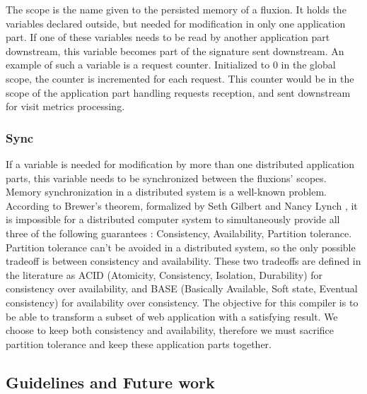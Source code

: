 The scope is the name given to the persisted memory of a fluxion.
It holds the variables declared outside, but needed for modification in only one application part.
If one of these variables needs to be read by another application part downstream, this variable becomes part of the signature sent downstream.
An example of such a variable is a request counter. Initialized to 0 in the global scope, the counter is incremented for each request.
This counter would be in the scope of the application part handling requests reception, and sent downstream for visit metrics processing.

\subsubsection{Sync}

If a variable is needed for modification by more than one distributed application parts, this variable needs to be synchronized between the fluxions' scopes.
Memory synchronization in a distributed system is a well-known problem.
According to Brewer's theorem, formalized by Seth Gilbert and Nancy Lynch \cite{Gilbert2002}, it is impossible for a distributed computer system to simultaneously provide all three of the following guarantees : Consistency, Availability, Partition tolerance.
Partition tolerance can't be avoided in a distributed system\cite{codahale2010}, so the only possible tradeoff is between consistency and availability.
These two tradeoffs are defined in the literature as ACID (Atomicity, Consistency, Isolation, Durability) for consistency over availability, and BASE (Basically Available, Soft state, Eventual consistency)\cite{Fox1997} for availability over consistency.
The objective for this compiler is to be able to transform a subset of web application with a satisfying result.
We choose to keep both consistency and availability, therefore we must sacrifice partition tolerance and keep these application parts together.

\subsection{Guidelines and Future work}

